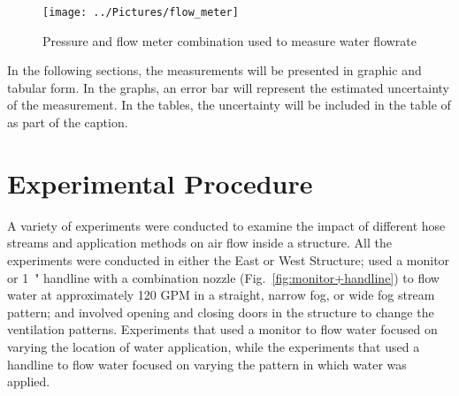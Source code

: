 \documentclass[12pt,oneside]{book}
\begin{document}
\begin{figure}[!ht]
\texttt{[image: ../Pictures/flow\_meter]}
\caption[Picture of Flowrate Meter]{Pressure and flow meter combination used to measure water flowrate}
\label{fig:flow_meter}
\end{figure}
\FloatBarrier

In the following sections, the measurements will be presented in graphic and tabular form. In the graphs, an error bar will represent the estimated uncertainty of the measurement. In the tables, the uncertainty will be included in the table of as part of the caption.

\section{Experimental Procedure}
\label{sec:Experimental_Procedure}


A variety of experiments were conducted to examine the impact of different hose streams and application methods on air flow inside a structure. All the experiments were conducted in either the East or West Structure; used a monitor %
or 1~" handline with a combination nozzle (Fig.~\ref{fig:monitor+handline}) to flow water at approximately 120 GPM in a straight, narrow fog, or wide fog stream pattern; and involved opening and closing doors in the structure to change the ventilation patterns. Experiments that used a monitor to flow water focused on varying the location of water application, while the experiments that used a handline to flow water focused on varying the pattern in which water was applied.
\end{document}
